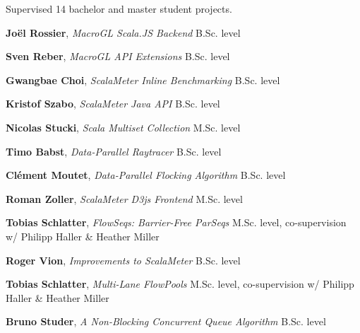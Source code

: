 \documentclass[9pt]{article}
\begin{document}
\noindent
Supervised 14 bachelor and master student projects.
\newline

\noindent
{\bf Joël Rossier},
{\em MacroGL Scala.JS Backend}
\newline\noindent B.Sc. level
\medskip

\noindent
{\bf Sven Reber},
{\em MacroGL API Extensions}
\newline\noindent B.Sc. level
\medskip

\noindent
{\bf Gwangbae Choi},
{\em ScalaMeter Inline Benchmarking}
\newline\noindent B.Sc. level
\medskip

\noindent
{\bf Kristof Szabo},
{\em ScalaMeter Java API}
\newline\noindent B.Sc. level
\medskip

\noindent
{\bf Nicolas Stucki},
{\em Scala Multiset Collection}
\newline\noindent M.Sc. level
\medskip

\noindent
{\bf Timo Babst},
{\em Data-Parallel Raytracer}
\newline\noindent B.Sc. level
\medskip

\noindent
{\bf Clément Moutet},
{\em Data-Parallel Flocking Algorithm}
\newline\noindent B.Sc. level
\medskip

\noindent
{\bf Roman Zoller},
{\em ScalaMeter D3js Frontend}
\newline\noindent M.Sc. level
\medskip

\noindent
{\bf Tobias Schlatter},
{\em FlowSeqs: Barrier-Free ParSeqs}
\newline\noindent M.Sc. level, co-supervision w/ Philipp Haller \& Heather Miller
\medskip

\noindent
{\bf Roger Vion},
{\em Improvements to ScalaMeter}
\newline\noindent B.Sc. level
\medskip

\noindent
{\bf Tobias Schlatter},
{\em Multi-Lane FlowPools}
\newline\noindent M.Sc. level, co-supervision w/ Philipp Haller \& Heather Miller
\medskip

\noindent
{\bf Bruno Studer},
{\em A Non-Blocking Concurrent Queue Algorithm}
\newline\noindent B.Sc. level
\medskip
\end{document}
